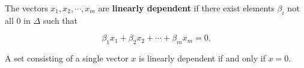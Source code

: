 The vectors $x_1, x_2, \cdots, x_m$ are \textbf{linearly dependent} if there exist elements $\beta_i$ not all $0$ in $\Delta$ such that

$$
\beta_1 x_1 + \beta_2 x_2 + \cdots + \beta_m x_m = 0.
$$

A set consisting of a single vector $x$ is linearly dependent if and only if $x = 0$.
